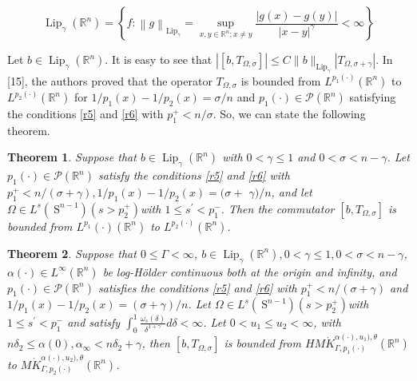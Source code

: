\documentclass[oneside,reqno]{amsart}
\newtheorem{theorem}{Theorem}[section]
\numberwithin{equation}{section}
\theoremstyle{definition}
\begin{document}
$$
\operatorname{Lip}_{\gamma}\left(\mathbb{R}^{n}\right)=\left\{f:\left\| g\right\|_{\operatorname{Lip}_{\gamma}}=\sup _{x, y \in \mathbb{R}^{n} ; x \neq y} \frac{|g(x)-g(y)|}{|x-y|^{\gamma}}<\infty\right\}
$$

Let $b \in \operatorname{Lip}_{\gamma}\left(\mathbb{R}^{n}\right)$. It is easy to see that $\left|\left[b, T_{\Omega, \sigma}\right]\right| \leq C\|b\|_{\operatorname{Lip}_{\gamma}}\left|T_{\Omega, \sigma+\gamma}\right|$. In [15], the authors proved that the operator $T_{\Omega, \sigma}$ is bounded from $L^{p_{1}(\cdot)}\left(\mathbb{R}^{n}\right)$ to $L^{p_{2}(\cdot)}\left(\mathbb{R}^{n}\right)$ for $1 / p_{1}(x)-1 / p_{2}(x)=\sigma / n$ and $p_{1}(\cdot) \in \mathcal{P}\left(\mathbb{R}^{n}\right)$ satisfying the conditions \eqref{r5} and \eqref{r6}  with $p_{1}^{+}<n / \sigma$. So, we can state the following theorem.


\begin{theorem}
    Suppose that $b \in \operatorname{Lip}_{\gamma}\left(\mathbb{R}^{n}\right)$ with $0<\gamma \leq 1$ and $0<\sigma<n-\gamma$. Let $p_{1}(\cdot) \in \mathcal{P}\left(\mathbb{R}^{n}\right)$ satisfy the conditions \eqref{r5} and \eqref{r6} with $p_{1}^{+}<n /(\sigma+\gamma), 1 / p_{1}(x)-1 / p_{2}(x)=(\sigma+$ $\gamma) / n$, and let $\Omega \in L^{s}\left(\mathrm{~S}^{n-1}\right)\left(s>p_{2}^{+}\right)$with $1 \leq s^{\prime}<p_{1}^{-}$. Then the commutator $\left[b, T_{\Omega, \sigma}\right]$ is bounded from $L^{p_{1}}(\cdot)\left(\mathbb{R}^{n}\right)$ to $L^{p_{2}(\cdot)}\left(\mathbb{R}^{n}\right)$.
\end{theorem}

\begin{theorem}

Suppose that  $0 \leq \Gamma<\infty$, $b \in \operatorname{Lip}_\gamma\left(\mathbb{R}^{n}\right), 0<\gamma \leq 1,0<\sigma<n-\gamma$,  $\alpha(\cdot) \in L^{\infty}\left(\mathbb{R}^{n}\right)$ be log-H\"older continuous both at the origin and infinity, and $p_{1}(\cdot) \in \mathcal{P}\left(\mathbb{R}^{n}\right)$ satisfies the conditions \eqref{r5} and \eqref{r6} with $p_{1}^{+}<n /( \sigma+\gamma)$ and $1 / p_{1}(x)-1 / p_{2}(x)=(\sigma +\gamma)/ n$.
Let $\Omega \in L^{s}\left(\mathrm{~S}^{n-1}\right)\left(s>p_{2}^{+}\right)$with $1 \leq s^{\prime}<p_{1}^{-}$ and satisfy $\int_{0}^{1} \frac{\omega_{s}(\delta)}{\delta^{1+\gamma}} d \delta<\infty$.
Let $0<u_{1} \leq u_{2}<\infty$, with $n \delta_{2} \leq  \alpha(0), \alpha_{\infty}<n \delta_{2} +\gamma $, then $\left[b, T_{\Omega, \sigma}\right]$ is bounded from $H M\dot{K} ^{\alpha(\cdot),u_1),\theta}_{ \Gamma, p_1(\cdot)}(\mathbb{R}^n)$ to $ M\dot{K} ^{\alpha(\cdot),u_2),\theta}_{ \Gamma, p_2(\cdot)}(\mathbb{R}^n)$.  
\end{theorem}
\end{document}
